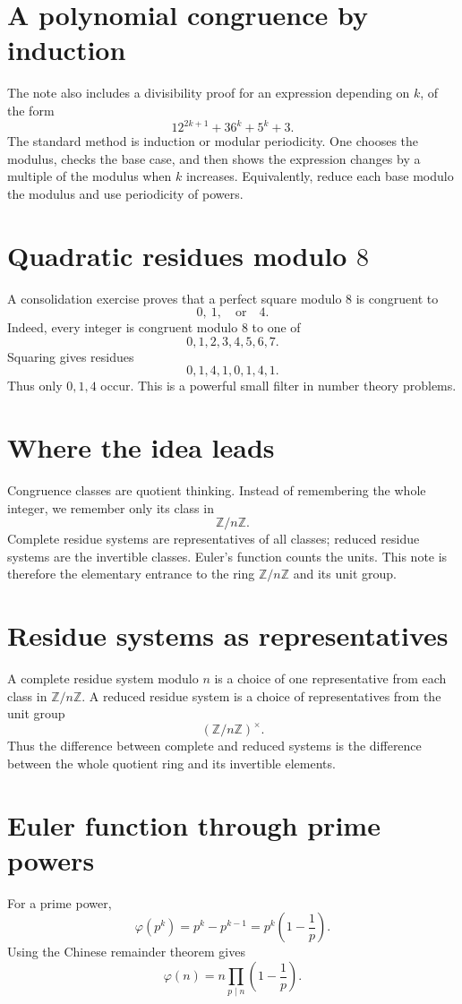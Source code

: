 \section{A polynomial congruence by induction}

The note also includes a divisibility proof for an expression depending on \(k\), of the form
\[
  12^{2k+1}+36^k+5^k+3.
\]
The standard method is induction or modular periodicity.  One chooses the modulus, checks the base case, and then shows the expression changes by a multiple of the modulus when \(k\) increases.  Equivalently, reduce each base modulo the modulus and use periodicity of powers.

\section[Quadratic residues modulo 8]{Quadratic residues modulo \(8\)}

A consolidation exercise proves that a perfect square modulo \(8\) is congruent to
\[
  0,\ 1,\quad\text{or}\quad4.
\]
Indeed, every integer is congruent modulo \(8\) to one of
\[
  0,1,2,3,4,5,6,7.
\]
Squaring gives residues
\[
  0,1,4,1,0,1,4,1.
\]
Thus only \(0,1,4\) occur.  This is a powerful small filter in number theory problems.

\section{Where the idea leads}

Congruence classes are quotient thinking.  Instead of remembering the whole integer, we remember only its class in
\[
  \mathbb Z/n\mathbb Z.
\]
Complete residue systems are representatives of all classes; reduced residue systems are the invertible classes.  Euler's function counts the units.  This note is therefore the elementary entrance to the ring \(\mathbb Z/n\mathbb Z\) and its unit group.

\section{Residue systems as representatives}
A complete residue system modulo \(n\) is a choice of one representative from each class in \(\mathbb Z/n\mathbb Z\).  A reduced residue system is a choice of representatives from the unit group
\[
(\mathbb Z/n\mathbb Z)^\times.
\]
Thus the difference between complete and reduced systems is the difference between the whole quotient ring and its invertible elements.
\section{Euler function through prime powers}
For a prime power,
\[
\varphi(p^k)=p^k-p^{k-1}=p^k\left(1-\frac1p\right).
\]
Using the Chinese remainder theorem gives
\[
\varphi(n)=n\prod_{p\mid n}\left(1-\frac1p\right).
\]
